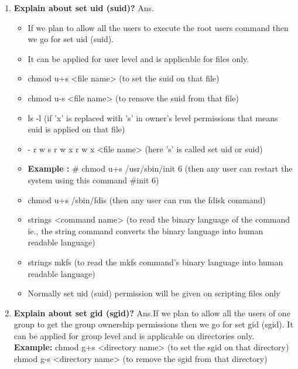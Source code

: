 \begin{enumerate}
    \bigskip
    \bigskip

    \item \textbf{Explain about set uid (suid)?}
    Ans.\begin{itemize}
            \item If we plan to allow all the users to execute the root users command then we go for set uid (suid).
            \item It can be applied for user level and is applicable for files only.
            \item chmod    u+s    <file name>	(to set the suid on that file)
            \item chmod    u-s     <file name>	(to remove the suid from that file)
            \item  ls   -l	(if   'x'  is replaced with   's'  in owner's  level permissions that means suid is applied on that file)
            \item - r w s r w x r w x     <file name>     (here   's'   is called set uid or suid)
            \item \textbf{Example :}   # chmod    u+s    /usr/sbin/init 6	(then any user can restart the system using this command 	   #init 6)
            \item chmod    u+s    /sbin/fdis	(then any user can run the fdisk command)
            \item strings     <command name>	(to read the binary language of the command ie., the string command converts the binary language into human readable language)
            \item strings    mkfs	(to read the mkfs command's binary language into human readable language)
            \item Normally set uid (suid) permission will be given on scripting files only
        \end{itemize}

    \bigskip
    \bigskip

    \item\textbf{Explain about set gid (sgid)?}
    \newline
    Ans.If we plan to allow all the users of one group to get the group ownership permissions then we go for 
    set gid 	   (sgid).	It can be applied for group level and is applicable on directories only.
    \textbf{Example:}  chmod     g+s    <directory name>	(to set the sgid on that directory)
         \newline
			chmod     g-s     <directory name>	(to remove the sgid from that directory)
    

\end{enumerate}
